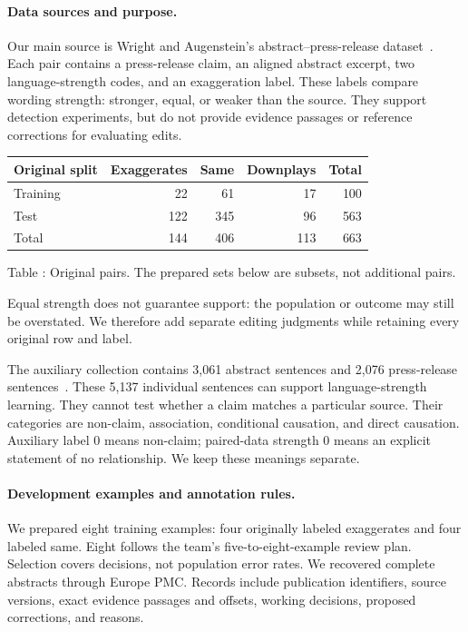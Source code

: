 \paragraph{Data sources and purpose.}
Our main source is Wright and Augenstein's abstract--press-release dataset~\cite{wright2021}.
Each pair contains a press-release claim, an aligned abstract excerpt, two language-strength codes, and an exaggeration label.
These labels compare wording strength: stronger, equal, or weaker than the source.
They support detection experiments, but do not provide evidence passages or reference corrections for evaluating edits.

\begin{center}
\begin{tabular}{lrrrr}
\toprule
Original split & Exaggerates & Same & Downplays & Total \\
\midrule
Training & 22 & 61 & 17 & 100 \\
Test & 122 & 345 & 96 & 563 \\
\midrule
Total & 144 & 406 & 113 & 663 \\
\bottomrule
\end{tabular}
\label{tab:paired-data}
\par\smallskip
Table \thetable: Original pairs. The prepared sets below are subsets, not additional pairs.
\end{center}

Equal strength does not guarantee support: the population or outcome may still be overstated.
We therefore add separate editing judgments while retaining every original row and label.

The auxiliary collection contains 3,061 abstract sentences and 2,076 press-release sentences~\cite{yu2019,yu2020}.
These 5,137 individual sentences can support language-strength learning.
They cannot test whether a claim matches a particular source.
Their categories are non-claim, association, conditional causation, and direct causation.
Auxiliary label 0 means non-claim; paired-data strength 0 means an explicit statement of no relationship.
We keep these meanings separate.

\paragraph{Development examples and annotation rules.}
We prepared eight training examples: four originally labeled exaggerates and four labeled same.
Eight follows the team's five-to-eight-example review plan.
Selection covers decisions, not population error rates.
We recovered complete abstracts through Europe PMC.
Records include publication identifiers, source versions, exact evidence passages and offsets, working decisions, proposed corrections, and reasons.

